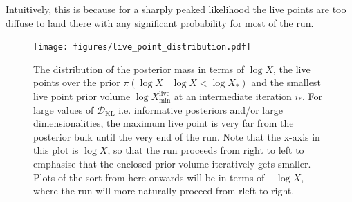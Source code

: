 \documentclass[usenatbib]{mnras}
\newcommand{\DKL}{\mathcal{D}_\mathrm{KL}}
\begin{document}
\par
Intuitively, this is because for a sharply peaked likelihood the live points are too diffuse to land there with any significant probability for most of the run.
\begin{figure}
\begin{center}
	\texttt{[image: figures/live\_point\_distribution.pdf]}
\end{center}
\caption{The distribution of the posterior mass in terms of $\log X$, the live points over the prior $\pi(\log X \mid \log X < \log X_*)$ and the smallest live point prior volume $\log X_\mathrm{min}^{\mathrm{live}}$ at an intermediate iteration $i_*$. For large values of $\DKL$ i.e. informative posteriors and/or large dimensionalities, the maximum live point is very far from the posterior bulk until the very end of the run. Note that the x-axis in this plot is $\log X$, so that the run proceeds from right to left to emphasise that the enclosed prior volume iteratively gets smaller. Plots of the sort from here onwards will be in terms of $-\log X$, where the run will more naturally proceed from rleft to right. }
\label{fig:live_point_distribution}
\end{figure}
\end{document}
